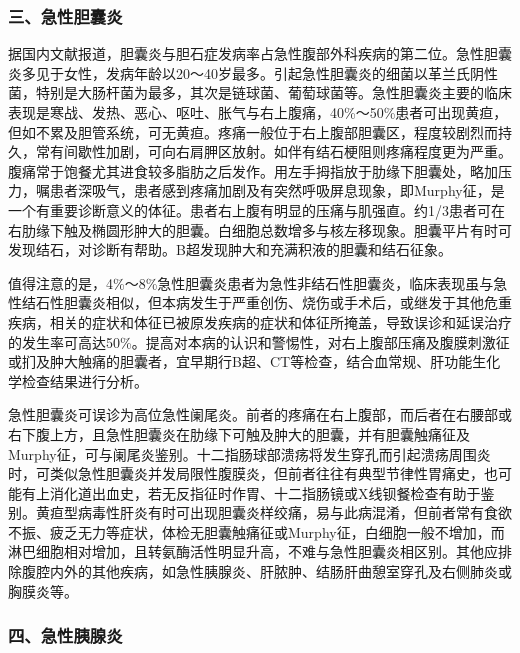 \subsubsection{三、急性胆囊炎}

据国内文献报道，胆囊炎与胆石症发病率占急性腹部外科疾病的第二位。急性胆囊炎多见于女性，发病年龄以20～40岁最多。引起急性胆囊炎的细菌以革兰氏阴性菌，特别是大肠杆菌为最多，其次是链球菌、葡萄球菌等。急性胆囊炎主要的临床表现是寒战、发热、恶心、呕吐、胀气与右上腹痛，40\%～50\%患者可出现黄疸，但如不累及胆管系统，可无黄疸。疼痛一般位于右上腹部胆囊区，程度较剧烈而持久，常有间歇性加剧，可向右肩胛区放射。如伴有结石梗阻则疼痛程度更为严重。腹痛常于饱餐尤其进食较多脂肪之后发作。用左手拇指放于肋缘下胆囊处，略加压力，嘱患者深吸气，患者感到疼痛加剧及有突然呼吸屏息现象，即Murphy征，是一个有重要诊断意义的体征。患者右上腹有明显的压痛与肌强直。约1/3患者可在右肋缘下触及椭圆形肿大的胆囊。白细胞总数增多与核左移现象。胆囊平片有时可发现结石，对诊断有帮助。B超发现肿大和充满积液的胆囊和结石征象。

值得注意的是，4\%～8\%急性胆囊炎患者为急性非结石性胆囊炎，临床表现虽与急性结石性胆囊炎相似，但本病发生于严重创伤、烧伤或手术后，或继发于其他危重疾病，相关的症状和体征已被原发疾病的症状和体征所掩盖，导致误诊和延误治疗的发生率可高达50\%。提高对本病的认识和警惕性，对右上腹部压痛及腹膜刺激征或扪及肿大触痛的胆囊者，宜早期行B超、CT等检查，结合血常规、肝功能生化学检查结果进行分析。

急性胆囊炎可误诊为高位急性阑尾炎。前者的疼痛在右上腹部，而后者在右腰部或右下腹上方，且急性胆囊炎在肋缘下可触及肿大的胆囊，并有胆囊触痛征及Murphy征，可与阑尾炎鉴别。十二指肠球部溃疡将发生穿孔而引起溃疡周围炎时，可类似急性胆囊炎并发局限性腹膜炎，但前者往往有典型节律性胃痛史，也可能有上消化道出血史，若无反指征时作胃、十二指肠镜或X线钡餐检查有助于鉴别。黄疸型病毒性肝炎有时可出现胆囊炎样绞痛，易与此病混淆，但前者常有食欲不振、疲乏无力等症状，体检无胆囊触痛征或Murphy征，白细胞一般不增加，而淋巴细胞相对增加，且转氨酶活性明显升高，不难与急性胆囊炎相区别。其他应排除腹腔内外的其他疾病，如急性胰腺炎、肝脓肿、结肠肝曲憩室穿孔及右侧肺炎或胸膜炎等。

\subsubsection{四、急性胰腺炎}

